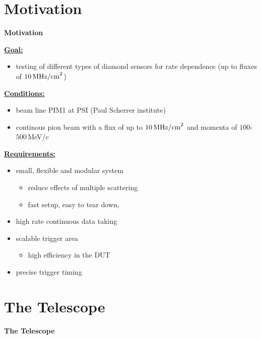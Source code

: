 \documentclass[9pt]{beamer}
\begin{document}
\section{Motivation}
\begin{frame}
	\begin{alertblock}{
		\begin{center}
			\Large{\textbf{Motivation}}
		\end{center}}
	\end{alertblock}
\end{frame}
\begin{frame}
	\underline{\textbf{Goal:}}
	\begin{itemize}
		\item testing of different types of diamond sensors for rate dependence (up to fluxes of $10\,\text{MHz/cm}^{2}$)
	\end{itemize}
	\underline{\textbf{Conditions:}}
	\begin{itemize}
		\item beam line PIM1 at PSI (Paul Scherrer institute)
		\item continous pion beam with a flux of up to $10\,\text{MHz/cm}^{2}$ and momenta of $100$-$500$\,MeV/c
	\end{itemize}
	\underline{\textbf{Requirements:}}
	\begin{itemize}
		\item small, flexible and modular system
		\begin{itemize}
			\item reduce effects of multiple scattering
			\item fast setup, easy to tear down, 
		\end{itemize}
		\item high rate continuous data taking
		\item scalable trigger area
		\begin{itemize}
			\item high efficiency in the DUT
		\end{itemize}
		\item precise trigger timing
	\end{itemize}
\end{frame}
\section{The Telescope}
\begin{frame}
	\begin{alertblock}{
		\begin{center}
			\Large{\textbf{The Telescope}}
		\end{center}}
	\end{alertblock}
\end{frame}
\end{document}
